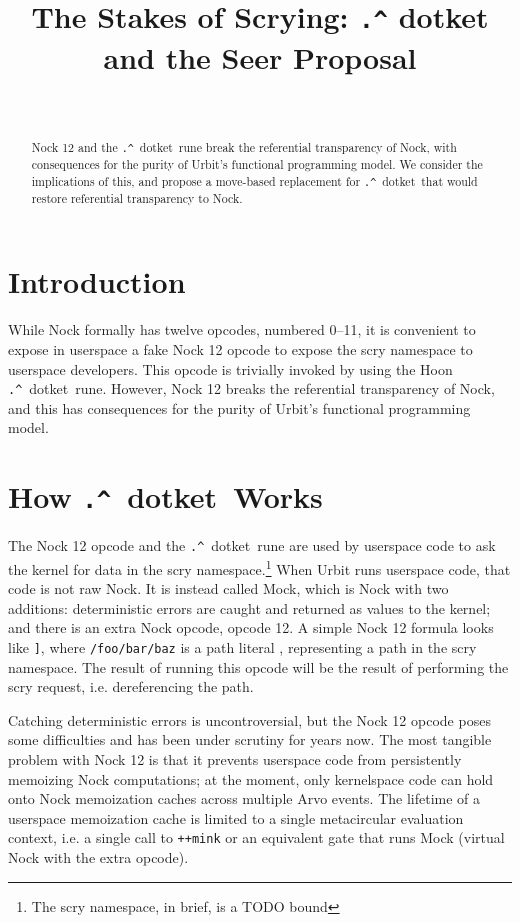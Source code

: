 \documentclass[twoside]{article}
\title{The Stakes of Scrying:  \texttt{\string.\string^} dotket and the Seer Proposal}
\author{\authorname~\authorpatp \\ \affiliation}
\date{}
\newcommand{\dotket}{\texttt{\string.\string^}~dotket}
\begin{document}
\maketitle
\thispagestyle{firststyle}

\begin{abstract}
Nock 12 and the \dotket~rune break the referential transparency of Nock, with consequences for the purity of Urbit's functional programming model.  We consider the implications of this, and propose a move-based replacement for \dotket~that would restore referential transparency to Nock.
\end{abstract}

\setcounter{page}{1}

\tableofcontents

\section{Introduction}

While Nock formally has twelve opcodes, numbered 0--11, it is convenient to expose in userspace a fake Nock 12 opcode to expose the scry namespace to userspace developers.  This opcode is trivially invoked by using the Hoon \dotket~rune.  However, Nock 12 breaks the referential transparency of Nock, and this has consequences for the purity of Urbit's functional programming model.

\section[How dotket Works]{How \dotket~Works}

The Nock 12 opcode and the \dotket~rune are used by userspace code to ask the kernel for data in the scry namespace.\footnote{The scry namespace, in brief, is a TODO bound}  When Urbit runs userspace code, that code is not raw Nock.  It is instead called Mock, which is Nock with two additions:   deterministic errors are caught and returned as values to the kernel; and there is an extra Nock opcode, opcode 12.  A simple Nock 12 formula looks like \texttt{\string[12 \string[1 /foo/bar/baz\string]\string]}, where \texttt{/foo/bar/baz} is a path literal \texttt{}, representing a path in the scry namespace.  The result of running this opcode will be the result of performing the scry request, i.e. dereferencing the path.

Catching deterministic errors is uncontroversial, but the Nock 12 opcode poses some difficulties and has been under scrutiny for years now.  The most tangible problem with Nock 12 is that it prevents userspace code from persistently memoizing Nock computations; at the moment, only kernelspace code can hold onto Nock memoization caches across multiple Arvo events.  The lifetime of a userspace memoization cache is limited to a single metacircular evaluation context, i.e. a single call to \texttt{++mink} or an equivalent gate that runs Mock (virtual Nock with the extra opcode).
\end{document}
